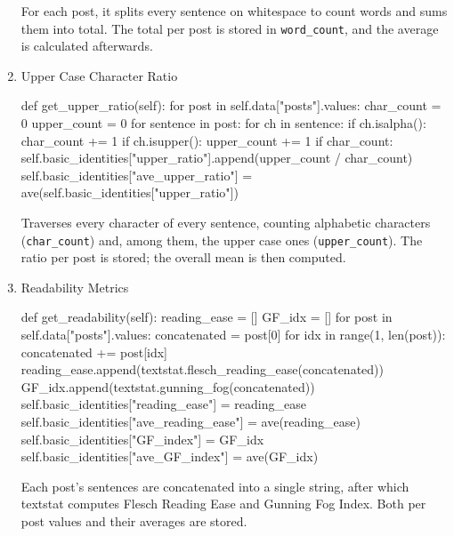 \documentclass[12pt]{article}
\numberwithin{figure}{section}  %
\begin{document}
\begin{enumerate}
		For each post, it splits every sentence on whitespace to count words and
		sums them into total. The total per post is stored in \texttt{word\_count}, and
		the average is calculated afterwards.
		\item Upper Case Character Ratio
		\begin{python}
def get_upper_ratio(self):
    for post in self.data["posts"].values:
        char_count = 0
        upper_count = 0
        for sentence in post:
            for ch in sentence:
                if ch.isalpha():
                    char_count += 1
                    if ch.isupper():
                        upper_count += 1
        if char_count:
            self.basic_identities["upper_ratio"].append(upper_count / char_count)
    self.basic_identities["ave_upper_ratio"] = ave(self.basic_identities["upper_ratio"])
		\end{python}
		
		Traverses every character of every sentence, counting alphabetic
		characters (\texttt{char\_count}) and, among them, the upper case ones
		(\texttt{upper\_count}). The ratio per post is stored; the overall mean is then
		computed.
		\item Readability Metrics
		\begin{python}
def get_readability(self):
    reading_ease = []
    GF_idx = []
    for post in self.data["posts"].values:
        concatenated = post[0]
        for idx in range(1, len(post)):
            concatenated += post[idx]
        reading_ease.append(textstat.flesch_reading_ease(concatenated))
        GF_idx.append(textstat.gunning_fog(concatenated))
    self.basic_identities["reading_ease"] = reading_ease
    self.basic_identities["ave_reading_ease"] = ave(reading_ease)
    self.basic_identities["GF_index"] = GF_idx
    self.basic_identities["ave_GF_index"] = ave(GF_idx)
		\end{python}
		
		Each post’s sentences are concatenated into a single string, after which
		textstat computes Flesch Reading Ease and Gunning Fog Index. Both per
		post values and their averages are stored.
	\end{enumerate}
	
\end{document}
